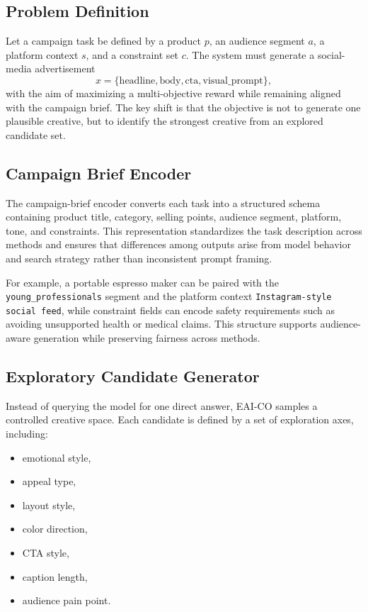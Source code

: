 \documentclass[preprint,12pt]{elsarticle}
\begin{document}
\subsection{Problem Definition}

Let a campaign task be defined by a product $p$, an audience segment $a$, a platform context $s$, and a constraint set $c$. The system must generate a social-media advertisement
\[
x = \{\text{headline}, \text{body}, \text{cta}, \text{visual\_prompt}\},
\]
with the aim of maximizing a multi-objective reward while remaining aligned with the campaign brief. The key shift is that the objective is not to generate one plausible creative, but to identify the strongest creative from an explored candidate set.

\subsection{Campaign Brief Encoder}

The campaign-brief encoder converts each task into a structured schema containing product title, category, selling points, audience segment, platform, tone, and constraints. This representation standardizes the task description across methods and ensures that differences among outputs arise from model behavior and search strategy rather than inconsistent prompt framing.

For example, a portable espresso maker can be paired with the \texttt{young\_professionals} segment and the platform context \texttt{Instagram-style social feed}, while constraint fields can encode safety requirements such as avoiding unsupported health or medical claims. This structure supports audience-aware generation while preserving fairness across methods.

\subsection{Exploratory Candidate Generator}

Instead of querying the model for one direct answer, EAI-CO samples a controlled creative space. Each candidate is defined by a set of exploration axes, including:
\begin{itemize}[leftmargin=1.5em]
    \item emotional style,
    \item appeal type,
    \item layout style,
    \item color direction,
    \item CTA style,
    \item caption length,
    \item audience pain point.
\end{itemize}
\end{document}
